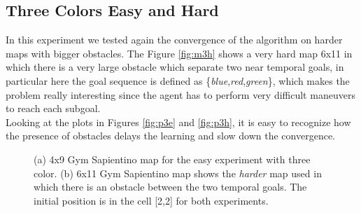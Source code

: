 \documentclass{article}
\begin{document}
\subsection{Three Colors Easy and Hard} %
In this experiment we tested again the convergence of the algorithm on harder maps with bigger obstacles. The Figure \ref{fig:m3h} shows a very hard map 6x11 in which there is a very large obstacle which separate two near temporal goals, in particular here the goal sequence is defined as \{\textit{blue},\textit{red},\textit{green}\}, which makes the problem really interesting since the agent has to perform very difficult maneuvers to reach each subgoal.\\
Looking at the plots in Figures \ref{fig:p3e} and \ref{fig:p3h}, it is easy to recognize how the presence of obstacles delays the learning and slow down the convergence.
\begin{figure}[h!]
  \centering
  \hfill
  \caption{(a) 4x9 Gym Sapientino map for the easy experiment with three color. (b) 6x11 Gym Sapientino map shows the \textit{harder} map used in which there is an obstacle between the two temporal goals. The initial position is in the cell [2,2] for both experiments.}
\end{figure}
\end{document}
